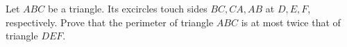 Let $ABC$ be a triangle. Its excircles touch sides $BC, CA, AB$ at $D, E, F$, respectively. Prove that the perimeter of triangle $ABC$ is at most twice that of triangle $DEF$.